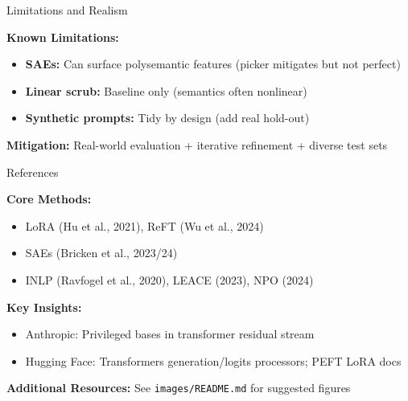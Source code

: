 \documentclass[aspectratio=169]{beamer}
\begin{document}
\begin{frame}[shrink=5]{Limitations and Realism}

\textcolor{mOrange}{\textbf{Known Limitations:}}

\begin{itemize}
  \item \textbf{SAEs:} Can surface polysemantic features (picker mitigates but not perfect)

  \item \textbf{Linear scrub:} Baseline only (semantics often nonlinear)

  \item \textbf{Synthetic prompts:} Tidy by design (add real hold-out)
\end{itemize}

\vspace{3mm}

\textcolor{mGreen}{\textbf{Mitigation:}} Real-world evaluation + iterative refinement + diverse test sets

\end{frame}

\begin{frame}{References}

\footnotesize

\textbf{Core Methods:}
\begin{itemize}
  \item LoRA (Hu et al., 2021), ReFT (Wu et al., 2024)
  \item SAEs (Bricken et al., 2023/24)
  \item INLP (Ravfogel et al., 2020), LEACE (2023), NPO (2024)
\end{itemize}

\vspace{2mm}

\textbf{Key Insights:}
\begin{itemize}
  \item Anthropic: Privileged bases in transformer residual stream
  \item Hugging Face: Transformers generation/logits processors; PEFT LoRA docs
\end{itemize}

\vspace{2mm}

\textbf{Additional Resources:}
See \texttt{images/README.md} for suggested figures

\end{frame}
\end{document}
